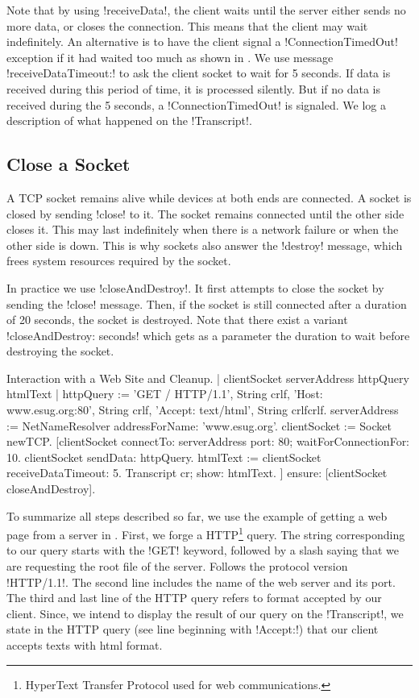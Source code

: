 \documentclass[a4paper,10pt,twoside]{book}
\begin{document}
Note that by using  \ct!receiveData!, the client waits until the server either sends no more data, or closes the connection.
This means that the client may wait indefinitely.
An alternative is to have the client signal a \ct!ConnectionTimedOut! exception if it had waited too much as shown in .
We use message \ct!receiveDataTimeout:! to ask the client socket to wait for 5 seconds.
If data is received during this period of time, it is processed silently.
But if no data is received during the 5 seconds, a \ct!ConnectionTimedOut! is signaled.
We log a description of what happened on the \ct!Transcript!.

\subsection{Close a Socket}
A TCP socket remains alive while devices at both ends are connected.
A socket is closed by sending \ct!close! to it.
The socket remains connected until the other side closes it.
This may last indefinitely when there is a network failure or when the other side is down.
This is why sockets also answer the \ct!destroy! message, which frees system resources required by the socket.

In practice we use \ct!closeAndDestroy!. It first attempts to close the socket by sending the \ct!close! message.
Then, if the socket is still connected after a duration of 20 seconds, the socket is destroyed.
Note that there exist a variant \ct!closeAndDestroy: seconds! which gets as a parameter the duration to wait before destroying the socket.

\begin{script}{Interaction with a Web Site and Cleanup.}
| clientSocket serverAddress httpQuery htmlText |
httpQuery := 'GET / HTTP/1.1', String crlf, 
	'Host: www.esug.org:80', String crlf, 
	'Accept: text/html', String crlfcrlf.
serverAddress := NetNameResolver addressForName: 'www.esug.org'.
clientSocket := Socket newTCP.
[clientSocket 
	connectTo: serverAddress port: 80;
	waitForConnectionFor: 10.
 clientSocket sendData: httpQuery.
 htmlText  := clientSocket receiveDataTimeout: 5.
 Transcript cr; show: htmlText.
] ensure: [clientSocket closeAndDestroy].
\end{script}

To summarize all steps described so far, we use the example of getting a web page from a server in 
.
First, we forge a HTTP\footnote{HyperText Transfer Protocol used for web communications.} query.
The string corresponding to our query starts with the \ct!GET! keyword, followed by a slash saying that we are requesting the root file of the server.
Follows the protocol version \ct!HTTP/1.1!.
The second line includes the name of the web server and its port.
The third and last line of the HTTP query refers to format accepted by our client. 
Since, we intend to display the result of our query on the \ct!Transcript!, we state in the HTTP query (see line beginning with \ct!Accept:!) that our client accepts texts with html format.
\end{document}
